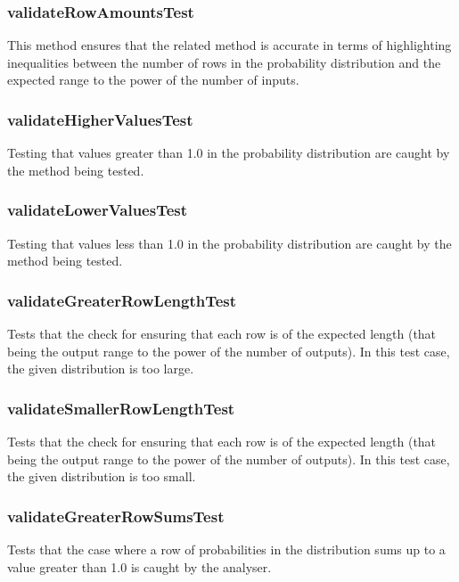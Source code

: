 \documentclass[report.tex]{subfiles}
\begin{document}
\subsubsection{validateRowAmountsTest} %
\label{ssub:validaterowamountstest}
This method ensures that the related method is accurate in terms of highlighting
inequalities between the number of rows in the probability distribution and the
expected range to the power of the number of inputs.

\subsubsection{validateHigherValuesTest} %
\label{ssub:validatehighervaluestest}
Testing that values greater than 1.0 in the probability distribution are caught
by the method being tested.

\subsubsection{validateLowerValuesTest} %
\label{ssub:validatelowervaluestest}
Testing that values less than 1.0 in the probability distribution are caught
by the method being tested.

\subsubsection{validateGreaterRowLengthTest} %
\label{ssub:validategreaterrowlengthtest}
Tests that the check for ensuring that each row is of the expected length (that
being the output range to the power of the number of outputs). In this test
case, the given distribution is too large.

\subsubsection{validateSmallerRowLengthTest} %
\label{ssub:validatesmallerrowlengthtest}
Tests that the check for ensuring that each row is of the expected length (that
being the output range to the power of the number of outputs). In this test
case, the given distribution is too small.

\subsubsection{validateGreaterRowSumsTest} %
\label{ssub:validategreaterrowsumstest}
Tests that the case where a row of probabilities in the distribution sums up to
a value greater than 1.0 is caught by the analyser.
\end{document}
